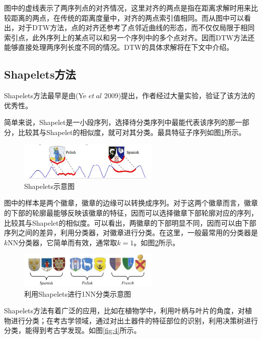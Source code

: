 图中的虚线表示了两序列点的对齐情况，这里对齐的两点是指在距离求解时用来比较距离的两点，在传统的距离度量中，对齐的两点索引值相同。而从图中可以看出，对于DTW方法，点的对齐还参考了点邻近曲线的形态，而不仅仅局限于相同索引点，此外序列上的某点可以和另一个序列中的多个点对齐。因而DTW方法还能够直接处理两序列长度不同的情况。DTW的具体求解将在下文中介绍。

\subsection{Shapelets方法}
Shapelets方法最早是由(Ye $et~al$ 2009)提出，作者经过大量实验，验证了该方法的优秀性\cite{Shapelets_website}。

简单来说，Shapelet是一小段序列，选择待分类序列中最能代表该序列的那一部分，比较其与Shapelet的相似度，就可对其分类。最具特征子序列如图\ref{fig:2}所示。

\begin{figure}[t]
  \centering
  \includegraphics[width=0.6\textwidth]{./figure/shapelets.png}
  \caption{Shapelets示意图}\label{fig:2}
\end{figure}

图中的样本是两个徽章，徽章的边缘可以转换成序列。对于这两个徽章而言，徽章的下部的轮廓最能够反映该徽章的特征，因而可以选择徽章下部轮廓对应的序列，比较其与Shapelet的相似度。可以看出，两徽章的下部明显不同，因而可以由下部序列之间的差异，利用分类器，对徽章进行分类。在这里，一般最常用的分类器是$k$NN分类器，它简单而有效，通常取$k=1$\cite{Xi2006}。如图\ref{fig:3}所示。

\begin{figure}[t]
  \centering
  \includegraphics[width=0.6\textwidth]{./figure/shapeletsclassify.JPG}
  \caption{利用Shapelets进行1NN分类示意图}\label{fig:3}
\end{figure}

Shapelets方法有着广泛的应用，比如在植物学中，利用叶柄与叶片的角度，对植物进行分类；在考古学领域，通过对出土器件的特征部位的识别，利用决策树进行分类，能得到考古学发现\cite{anthropology}。如图\ref{fig:4}所示。

